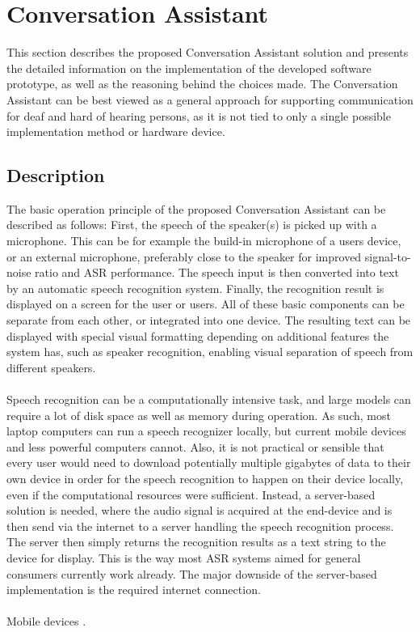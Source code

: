 \documentclass[english, 12pt, a4paper, pdftex, elec, utf8]{aaltothesis}
\begin{document}
\clearpage

\section{Conversation Assistant} \label{sec:implementation}

This section describes the proposed Conversation Assistant solution and presents the detailed information on the implementation of the developed software prototype, as well as the reasoning behind the choices made. The Conversation Assistant can be best viewed as a general approach for supporting communication for deaf and hard of hearing persons, as it is not tied to only a single possible implementation method or hardware device.  

\subsection{Description}

The basic operation principle of the proposed Conversation Assistant can be described as follows: First, the speech of the speaker(s) is picked up with a microphone. This can be for example the build-in microphone of a users device, or an external microphone, preferably close to the speaker for improved signal-to-noise ratio and ASR performance. The speech input is then converted into text by an automatic speech recognition system. Finally, the recognition result is displayed on a screen for the user or users. All of these basic components can be separate from each other, or integrated into one device. The resulting text can be displayed with special visual formatting depending on additional features the system has, such as speaker recognition, enabling visual separation of speech from different speakers. \\\\
Speech recognition can be a computationally intensive task, and large models can require a lot of disk space as well as memory during operation. As such, most laptop computers can run a speech recognizer locally, but current mobile devices and less powerful computers cannot. Also, it is not practical or sensible that every user would need to download potentially multiple gigabytes of data to their own device in order for the speech recognition to happen on their device locally, even if the computational resources were sufficient. Instead, a server-based solution is needed, where the audio signal is acquired at the end-device and is then send via the internet to a server handling the speech recognition process. The server then simply returns the recognition results as a text string to the device for display. This is the way most ASR systems aimed for general consumers currently work already. The major downside of the server-based implementation is the required internet connection. \\\\
Mobile devices \cite{mcgraw2016personalized}.
\end{document}
